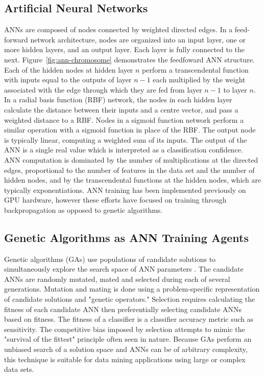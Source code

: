 \documentclass[11pt]{article}       %
\begin{document}
\subsection{Artificial Neural Networks} \label{ann}
ANNs are composed of nodes connected by weighted directed edges. In a feed-forward network architecture, nodes are organized into an input layer, one or more hidden layers, and an output layer. Each layer is fully connected to the next. Figure~\ref{fig:ann-chromosome} demonstrates the feedfoward ANN structure. Each of the hidden nodes at hidden layer $n$ perform a transcendental function with inputs equal to the outputs of layer $n-1$ each multiplied by the weight associated with the edge through which they are fed from layer $n-1$ to layer $n$. In a radial basis function (RBF) network, the nodes in each hidden layer calculate the distance between their inputs and a centre vector, and pass a weighted distance to a RBF. Nodes in a sigmoid function network perform a similar operation with a sigmoid function in place of the RBF. The output node is typically linear, computing a weighted sum of its inputs. The output of the ANN is a single real value which is interpreted as a classification confidence. ANN computation is dominated by the number of multiplications at the directed edges, proportional to the number of features in the data set and the number of hidden nodes, and by the transcendental functions at the hidden nodes, which are typically exponentiations.  ANN training has been implemented previously on GPU hardware, however these efforts have focused on training through backpropagation \cite{backprop} as opposed to genetic algorithms.

\subsection{Genetic Algorithms as ANN Training Agents} \label{ga}
Genetic algorithms (GAs) use populations of candidate solutions to simultaneously explore the search space of ANN parameters \cite{GA-ANN}. The candidate ANNs are randomly mutated, mated and selected during each of several generations. Mutation and mating is done using a problem-specific representation of candidate solutions and "genetic operators." Selection requires calculating the fitness of each candidate ANN  then preferentially selecting candidate ANNs based on fitness. The fitness of a classifier is a classifier accuracy metric such as sensitivity.  The competitive bias imposed by selection attempts to mimic the "survival of the fittest" principle often seen in nature.  Because GAs perform an unbiased search of a solution space and ANNs can be of arbitrary complexity, this technique is suitable for data mining applications using large or complex data sets.
\end{document}
